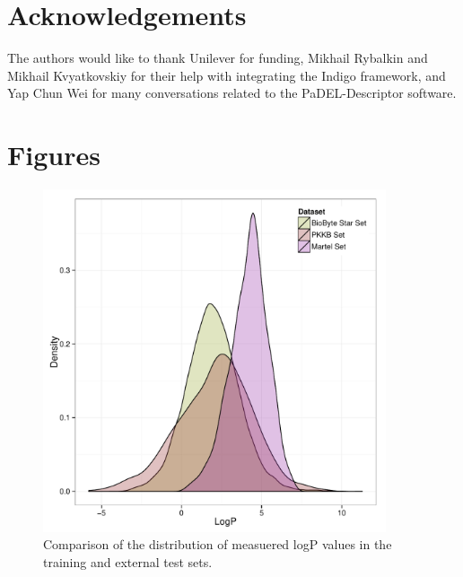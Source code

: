 \documentclass[10pt]{bmc_article}
\newenvironment{bmcformat}{\begin{raggedright}\baselineskip20pt\sloppy\setboolean{publ}{false}}{\end{raggedright}\baselineskip20pt\sloppy}
\begin{document}
\begin{bmcformat}
\section*{Acknowledgements}
The authors would like to thank Unilever for funding, Mikhail Rybalkin and Mikhail Kvyatkovskiy for their help with integrating the Indigo framework, and Yap Chun Wei for many conversations related to the PaDEL-Descriptor software. 
 
\newpage



\newpage
\section*{Figures}

\begin{figure}[ht]
  \centering
  \includegraphics[width=0.9\textwidth]{./Figures/logP_distributions.pdf}
  \caption{Comparison of the distribution of measuered logP values in the training and external test sets.}
  \label{fig:distribution_comparison}
\end{figure}


\end{bmcformat}
\end{document}
